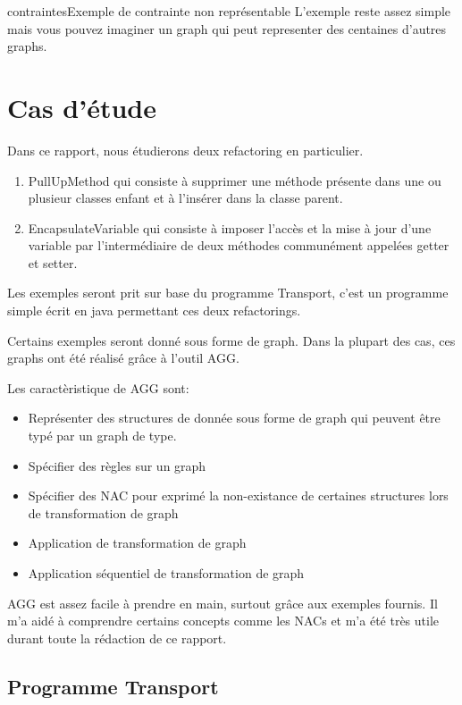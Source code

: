 \documentclass[a4paper, 12pt]{article}
\begin{document}
\begin{figu}{contraintes}{Exemple de contrainte non représentable}
  L'exemple reste assez simple mais vous pouvez imaginer un graph qui peut representer des centaines d'autres graphs.

  \section{Cas d'étude}

  Dans ce rapport, nous étudierons deux refactoring en particulier.

  \begin{enumerate}
    \item PullUpMethod qui consiste à supprimer une méthode présente dans une ou plusieur classes enfant et à l'insérer dans la classe parent.
    \item EncapsulateVariable qui consiste à imposer l'accès et la mise à jour d'une variable par l'intermédiaire de deux méthodes communément appelées getter et setter.
  \end{enumerate}

  Les exemples seront prit sur base du programme Transport, c'est un programme simple écrit en java permettant ces deux refactorings.

  Certains exemples seront donné sous forme de graph. Dans la plupart des cas, ces graphs ont été réalisé grâce à l'outil AGG.

  Les caractèristique de AGG sont:

  \begin{itemize}[label=\textbullet]
    \item Représenter des structures de donnée sous forme de graph qui peuvent être typé par un graph de type.
    \item Spécifier des règles sur un graph
    \item Spécifier des NAC pour exprimé la non-existance de certaines structures lors de transformation de graph
    \item Application de transformation de graph
    \item Application séquentiel de transformation de graph
  \end{itemize}

  AGG est assez facile à prendre en main, surtout grâce aux exemples fournis. Il m'a aidé à comprendre certains concepts comme les NACs et m'a été très utile durant toute la rédaction de ce rapport.

  \subsection{Programme Transport}


\end{figu}
\end{document}
